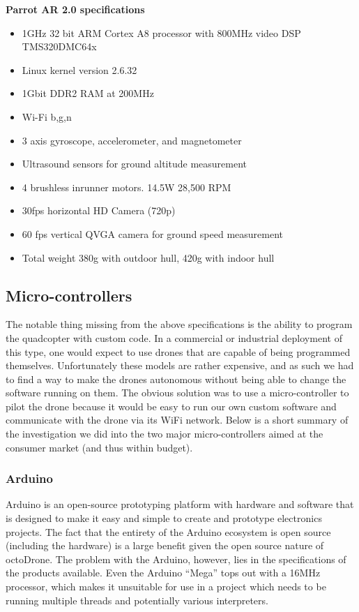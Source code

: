 \begin{aside}
\textbf{Parrot AR 2.0 specifications\cite{parrotspecs}}
\begin{itemize}
\item 1GHz 32 bit ARM Cortex A8 processor with 800MHz video DSP TMS320DMC64x
\item Linux kernel version 2.6.32
\item 1Gbit DDR2 RAM at 200MHz
\item Wi-Fi b,g,n
\item 3 axis gyroscope, accelerometer, and magnetometer
\item Ultrasound sensors for ground altitude measurement
\item 4 brushless inrunner motors. 14.5W 28,500 RPM
\item 30fps horizontal HD Camera (720p)
\item 60 fps vertical QVGA camera for ground speed measurement
\item Total weight 380g with outdoor hull, 420g with indoor hull
\end{itemize}
\end{aside}

\subsection{Micro-controllers}
The notable thing missing from the above specifications is the ability to program the quadcopter with custom code. In a commercial or industrial deployment of this type, one would expect to use drones that are capable of being programmed themselves. Unfortunately these models are rather expensive, and as such we had to find a way to make the drones autonomous without being able to change the software running on them. The obvious solution was to use a micro-controller to pilot the drone because it would be easy to run our own custom software and communicate with the drone via its WiFi network. Below is a short summary of the investigation we did into the two major micro-controllers aimed at the consumer market (and thus within budget).

\subsubsection{Arduino}
Arduino is an open-source prototyping platform with hardware and software that is designed to make it easy and simple to create and prototype electronics projects\cite{arduinoguide}. The fact that the entirety of the Arduino ecosystem is open source (including the hardware) is a large benefit given the open source nature of octoDrone. The problem with the Arduino, however, lies in the specifications of the products available. Even the Arduino ``Mega'' tops out with a 16MHz processor, which makes it unsuitable for use in a project which needs to be running multiple threads and potentially various interpreters.

